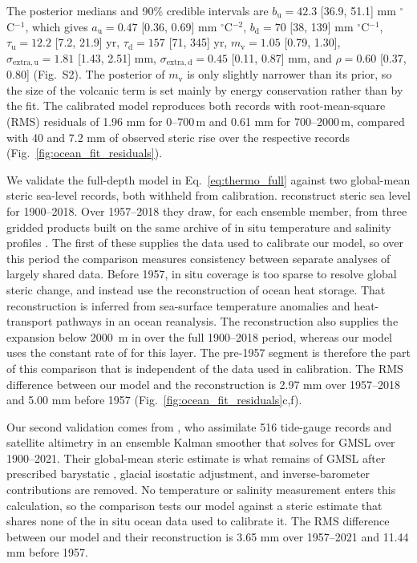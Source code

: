 \documentclass[draft,linenumbers]{agujournal2025}
\begin{document}
The posterior medians and 90\% credible intervals are $b_{\mathrm{u}} = 42.3$ [36.9, 51.1] mm $^\circ$C$^{-1}$, which gives $a_{\mathrm{u}} = 0.47$ [0.36, 0.69] mm $^\circ$C$^{-2}$, $b_{\mathrm{d}} = 70$ [38, 139] mm $^\circ$C$^{-1}$, $\tau_{\mathrm{u}} = 12.2$ [7.2, 21.9] yr, $\tau_{\mathrm{d}} = 157$ [71, 345] yr, $m_{\mathrm{v}} = 1.05$ [0.79, 1.30], $\sigma_{\mathrm{extra,u}} = 1.81$ [1.43, 2.51] mm, $\sigma_{\mathrm{extra,d}} = 0.45$ [0.11, 0.87] mm, and $\rho = 0.60$ [0.37, 0.80] (Fig.~S2). The posterior of $m_{\mathrm{v}}$ is only slightly narrower than its prior, so the size of the volcanic term is set mainly by energy conservation rather than by the fit. The calibrated model reproduces both records with root-mean-square (RMS) residuals of 1.96 mm for 0--700\,m and 0.61 mm for 700--2000\,m, compared with 40 and 7.2 mm of observed steric rise over the respective records (Fig.~\ref{fig:ocean_fit_residuals}).


We validate the full-depth model in Eq.~\ref{eq:thermo_full} against two global-mean steric sea-level records, both withheld from calibration. \citet{Frederikse2020} reconstruct steric sea level for 1900--2018. Over 1957--2018 they draw, for each ensemble member, from three gridded products built on the same archive of in situ temperature and salinity profiles \citep{Levitus2012, Ishii2017, Cheng2016}. The first of these supplies the data used to calibrate our model, so over this period the comparison measures consistency between separate analyses of largely shared data. Before 1957, in situ coverage is too sparse to resolve global steric change, and \citet{Frederikse2020} instead use the \citet{Zanna2019} reconstruction of ocean heat storage. That reconstruction is inferred from sea-surface temperature anomalies and heat-transport pathways in an ocean reanalysis. The \citet{Zanna2019} reconstruction also supplies the expansion below 2000~m in \citet{Frederikse2020} over the full 1900--2018 period, whereas our model uses the constant rate of \citet{Desbruyeres2016} for this layer. The pre-1957 segment is therefore the part of this comparison that is independent of the data used in calibration. The RMS difference between our model and the reconstruction is 2.97 mm over 1957--2018 and 5.00 mm before 1957 (Fig.~\ref{fig:ocean_fit_residuals}c,f).

Our second validation comes from \citet{Dangendorf2024}, who assimilate 516 tide-gauge records and satellite altimetry in an ensemble Kalman smoother that solves for GMSL over 1900--2021. Their global-mean steric estimate is what remains of GMSL after prescribed barystatic \citep[from][]{Frederikse2020}, glacial isostatic adjustment, and inverse-barometer contributions are removed. No temperature or salinity measurement enters this calculation, so the comparison tests our model against a steric estimate that shares none of the in situ ocean data used to calibrate it. The RMS difference between our model and their reconstruction is 3.65 mm over 1957--2021 and 11.44 mm before 1957. 
\end{document}
